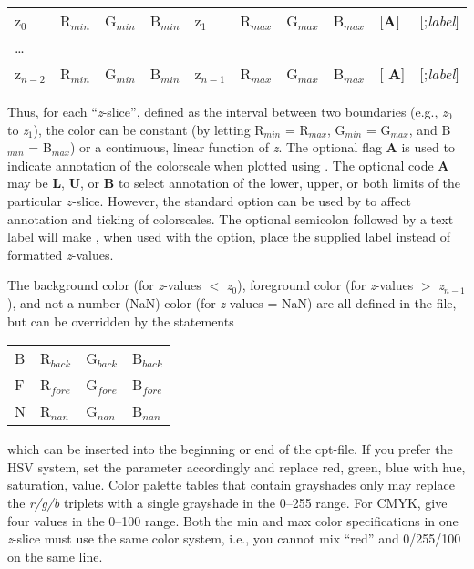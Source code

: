 \begin{center}
\begin{tabular}{llllllllll}
z$_0$ &  R$_{min}$ &  G$_{min}$ &  B$_{min}$ &  z$_1$ & R$_{max}$ &  G$_{max}$ &  B$_{max}$ &  [\textbf{A}] &
[;\emph{label}] \\ 
\ldots & & & & & & & & & \\ 
z$_{n-2}$ &  R$_{min}$ &  G$_{min}$ &  B$_{min}$ &  z$_{n-1}$ &  R$_{max}$ &  G$_{max}$ &  B$_{max}$ &  [{\bf
A}] & [;\emph{label}]\\
\end{tabular} 
\end{center}

Thus, for each ``\emph{z}-slice'', defined as the interval between two boundaries
(e.g., \emph{z$_0$} to \emph{z$_1$}), the color can be constant (by letting R$_{min}$
= R$_{max}$, G$_{min}$ = G$_{max}$, and B$_{min}$ = B$_{max}$) or a continuous,
linear function of \emph{z}.  The optional flag \textbf{A} is used to indicate annotation
of the colorscale when plotted using .  The optional code \textbf{A} may be \textbf{L},
\textbf{U}, or \textbf{B} to select annotation of the lower, upper, or both limits
of the particular $z$-slice.  However, the standard  option can be used
by  to affect annotation and ticking of colorscales.  The optional
semicolon followed by a text label will make , when used with the  option,
place the supplied label instead of formatted \emph{z}-values.

The background color (for \emph{z}-values $<$ \emph{z$_0$}), foreground color
(for \emph{z}-values $>$ \emph{z$_{n-1}$}), and not-a-number (NaN) color (for
\emph{z}-values = NaN) are all defined in the 
file, but can be overridden by the statements

\begin{center}
\begin{tabular}{llll}
B &  R$_{back}$ &  G$_{back}$ &  B$_{back}$ \\ 
F &  R$_{fore}$ &  G$_{fore}$ &  B$_{fore}$ \\ 
N &  R$_{nan}$ &  G$_{nan}$ &  B$_{nan}$ \\

\end{tabular}
\end{center}

\noindent
which can be inserted into the beginning or end of the cpt-file.  If
you prefer the HSV system, set the
 parameter accordingly and replace red, green,
blue with hue, saturation, value.  Color palette tables that contain
grayshades only may replace the \emph{r/g/b} triplets with a single grayshade
in the 0--255 range.  For CMYK, give four values in the 0--100 range.
Both the min and max color specifications in one \emph{z}-slice must use
the same color system, i.e., you cannot mix ``red'' and 0/255/100 on the
same line.

